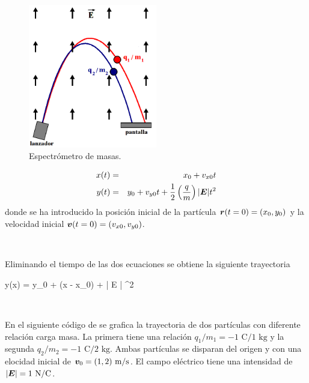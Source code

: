 \begin{figure}[htbp]
	\centering
	\includegraphics[width=0.50\textwidth]
	{./pictures/mass_spectrometer.png}

	\caption{\small{Espectrómetro de masas.}}
	
	\label{fig:mass_spectrometer}
\end{figure}


\begin{eqnarray}
\label{eq:x_equation}
x(t) &=& x_0 + v_{x0}t \\
\label{eq:y_equation}
y(t) &=& y_0 + v_{y0}t + \frac{1}{2}\left( \frac{q}{m} \right)|\boldsymbol{ E }| t^2
\end{eqnarray}
donde se ha introducido la posición inicial de la partícula $\boldsymbol{ r }(t=0) = 
(x_0, y_0)$ y la velocidad inicial $\boldsymbol{ v }(t=0) = (v_{x0}, v_{y0})$.

\

Eliminando el tiempo de las dos ecuaciones se obtiene la siguiente 
trayectoria


{y(x) = y_0 + (x - x_0) + 
| \bds E | ^2}

\

En el siguiente código de \python se grafica la trayectoria de dos 
partículas con diferente relación carga masa. La primera tiene una 
relación $q_1/m_1 = -1\mbox{ C}/1 \mbox{ kg}$ y la segunda $q_2/m_2 = 
-1\mbox{ C}/2 \mbox{ kg}$. Ambas partículas se disparan del origen y con 
una elocidad inicial de $\boldsymbol{ v }_0 = (1, 2) \mbox{ m/s}$. El campo eléctrico 
tiene una intensidad de $|\boldsymbol{ E }| = 1 \mbox{ N/C}$.

